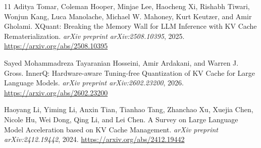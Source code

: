 \documentclass[11pt]{article}
\begin{document}
\begin{thebibliography}{11}
Aditya Tomar, Coleman Hooper, Minjae Lee, Haocheng Xi, Rishabh Tiwari, Wonjun Kang, Luca Manolache, Michael W. Mahoney, Kurt Keutzer, and Amir Gholami.
\newblock XQuant: Breaking the Memory Wall for LLM Inference with KV Cache Rematerialization.
\newblock \emph{arXiv preprint arXiv:2508.10395}, 2025. \url{https://arxiv.org/abs/2508.10395}

Sayed Mohammadreza Tayaranian Hosseini, Amir Ardakani, and Warren J. Gross.
\newblock InnerQ: Hardware-aware Tuning-free Quantization of KV Cache for Large Language Models.
\newblock \emph{arXiv preprint arXiv:2602.23200}, 2026. \url{https://arxiv.org/abs/2602.23200}

Haoyang Li, Yiming Li, Anxin Tian, Tianhao Tang, Zhanchao Xu, Xuejia Chen, Nicole Hu, Wei Dong, Qing Li, and Lei Chen.
\newblock A Survey on Large Language Model Acceleration based on KV Cache Management.
\newblock \emph{arXiv preprint arXiv:2412.19442}, 2024. \url{https://arxiv.org/abs/2412.19442}

\end{thebibliography}
\end{document}
